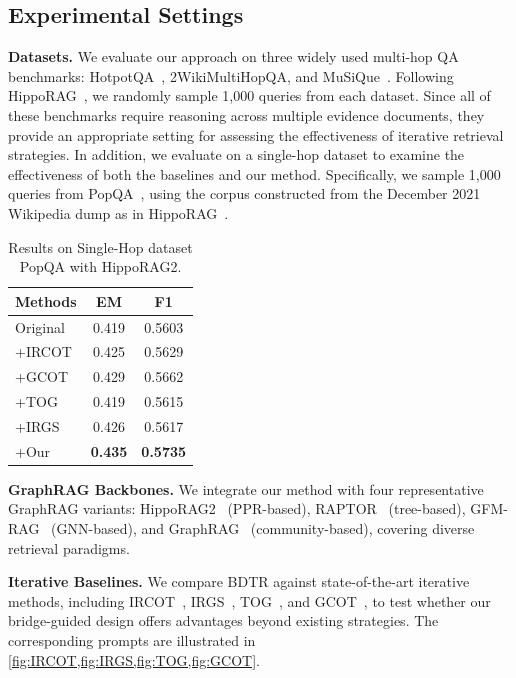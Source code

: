 \documentclass{article} %
\begin{document}
\subsection{Experimental Settings}
\label{sec:exper}
\textbf{Datasets.}  
We evaluate our approach on three widely used multi-hop QA benchmarks: HotpotQA~\citep{yang2018hotpotqa}, 2WikiMultiHopQA, and MuSiQue~\citep{trivedi2022musique}. Following HippoRAG~\citep{jimenez2024hipporag}, we randomly sample 1,000 queries from each dataset. Since all of these benchmarks require reasoning across multiple evidence documents, they provide an appropriate setting for assessing the effectiveness of iterative retrieval strategies. In addition, we evaluate on a single-hop dataset to examine the effectiveness of both the baselines and our method. Specifically, we sample 1,000 queries from PopQA~\citep{mallen2022not}, using the corpus constructed from the December 2021 Wikipedia dump as in HippoRAG~\citep{jimenez2024hipporag}.

\begin{table}
\centering
\begin{tabular}{lcc}
\toprule
Methods & EM & F1 \\
\midrule
Original & 0.419 & 0.5603 \\
+IRCOT    & 0.425 & 0.5629 \\
+GCOT     & 0.429 & 0.5662 \\
+TOG      & 0.419 & 0.5615 \\
+IRGS     & 0.426 & 0.5617 \\
+Our      & \textbf{0.435} & \textbf{0.5735} \\
\bottomrule
\end{tabular}
\caption{Results on Single-Hop dataset PopQA with HippoRAG2.}
\label{tab:popqa}
\end{table}
\textbf{GraphRAG Backbones.}
We integrate our method with four representative GraphRAG variants: HippoRAG2~\citep{gutierrez2025rag} (PPR-based), RAPTOR~\citep{sarthi2024raptor} (tree-based), GFM-RAG~\citep{luo2025gfm} (GNN-based), and GraphRAG~\citep{edge2024local} (community-based), covering diverse retrieval paradigms.

\textbf{Iterative Baselines.}
We compare BDTR against state-of-the-art iterative methods, including IRCOT~\citep{trivedi2022interleaving}, IRGS~\citep{shao2023enhancing}, TOG~\citep{sun2023think}, and GCOT~\citep{jin2024graph}, to test whether our bridge-guided design offers advantages beyond existing strategies. The corresponding prompts are illustrated in \cref{fig:IRCOT,fig:IRGS,fig:TOG,fig:GCOT}.
\end{document}
